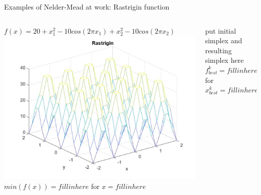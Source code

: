 \documentclass{beamer}
\begin{document}
\begin{frame}{Examples of Nelder-Mead at work: Rastrigin function}
\begin{columns}
\begin{column}{0.49\linewidth}
	\small $f(x) = 20 + x_1^2 - 10cos(2\pi x_1) + x_2^2 - 10cos(2\pi x_2)$ \\
	\includegraphics[width=0.95\linewidth]{rastriginPlotS1}	 \\
	$min(f(x))= fill in here $ for $x= fill in here$
\end{column}
\begin{column}{0.49\linewidth}
	put initial simplex and resulting simplex here\\
	$f^k_{best}= fill in here $ for $x^k_{best}= fill in here$
\end{column}
\end{columns}
\end{frame}
\end{document}
